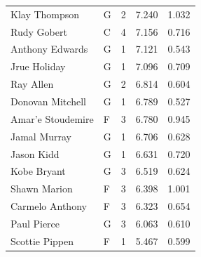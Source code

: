 \begin{table}[t]
\begin{tabular*}{\linewidth}{@{\extracolsep{\fill}}llcrr}
Klay Thompson & G & 2 & 7.240 & 1.032 \\ 
Rudy Gobert & C & 4 & 7.156 & 0.716 \\ 
Anthony Edwards & G & 1 & 7.121 & 0.543 \\ 
Jrue Holiday & G & 1 & 7.096 & 0.709 \\ 
Ray Allen & G & 2 & 6.814 & 0.604 \\ 
Donovan Mitchell & G & 1 & 6.789 & 0.527 \\ 
Amar'e Stoudemire & F & 3 & 6.780 & 0.945 \\ 
Jamal Murray & G & 1 & 6.706 & 0.628 \\ 
Jason Kidd & G & 1 & 6.631 & 0.720 \\ 
Kobe Bryant & G & 3 & 6.519 & 0.624 \\ 
Shawn Marion & F & 3 & 6.398 & 1.001 \\ 
Carmelo Anthony & F & 3 & 6.323 & 0.654 \\ 
Paul Pierce & G & 3 & 6.063 & 0.610 \\ 
Scottie Pippen & F & 1 & 5.467 & 0.599 \\ 
\bottomrule
\end{tabular*}
\end{table}

